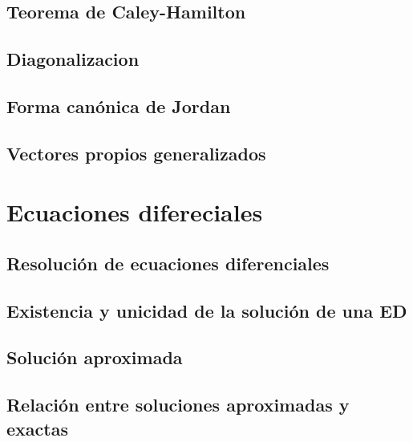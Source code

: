 \documentclass{tufte-book}
\numberwithin{equation}{chapter}
\begin{document}
    \chapter{Teorema de Caley-Hamilton}
    \chapter{Diagonalizacion}
    \chapter{Forma canónica de Jordan}
    \chapter{Vectores propios generalizados}
  \part{Ecuaciones difereciales}
    \chapter{Resolución de ecuaciones diferenciales}
    \chapter{Existencia y unicidad de la solución de una ED}
    \chapter{Solución aproximada}
    \chapter{Relación entre soluciones aproximadas y exactas}
\end{document}
